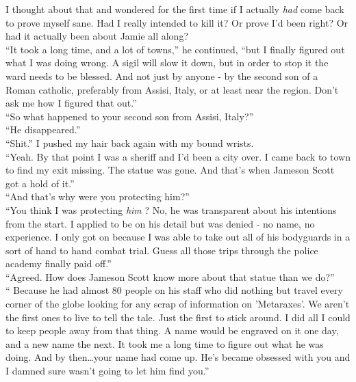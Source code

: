 \documentclass[a5paper]{scrartcl}
\begin{document}
I thought about that and wondered for the first time if I actually \textit{had}
 come back to prove myself sane. Had I really intended to kill it? Or prove I'd been right? Or had it actually been about Jamie all along?\\


\enquote{It took a long time, and a lot of towns,} he continued, \enquote{but I finally figured out what I was doing wrong. A sigil will slow it down, but in order to stop it the ward needs to be blessed. And not just by anyone - by the second son of a Roman catholic, preferably from Assisi, Italy, or at least near the region. Don't ask me how I figured that out.}\\


\enquote{So what happened to your second son from Assisi, Italy?}\\


\enquote{He disappeared.}\\


\enquote{Shit.} I pushed my hair back again with my bound wrists.\\


\enquote{Yeah. By that point I was a sheriff and I'd been a city over. I came back to town to find my exit missing. The statue was gone. And that's when Jameson Scott got a hold of it.}\\


\enquote{And that's why were you protecting him?}\\


\enquote{You think I was protecting \textit{him}
? No, he was transparent about his intentions from the start. I applied to be on his detail but was denied - no name, no experience. I only got on because I was able to take out all of his bodyguards in a sort of hand to hand combat trial. Guess all those trips through the police academy finally paid off.}\\


\enquote{Agreed. How does Jameson Scott know more about that statue than we do?}\\


\enquote{ Because he had almost 80 people on his staff who did nothing but travel every corner of the globe looking for any scrap of information on 'Metaraxes'.  We aren't the first ones to live to tell the tale. Just the first to stick around.  I did all I could to keep people away from that thing. A name would be engraved on it one day, and a new name the next. It took me a long time to figure out what he was doing. And by then\dots your name had come up. He's became obsessed with you and I damned sure wasn't going to let him find you.}\\
\end{document}
